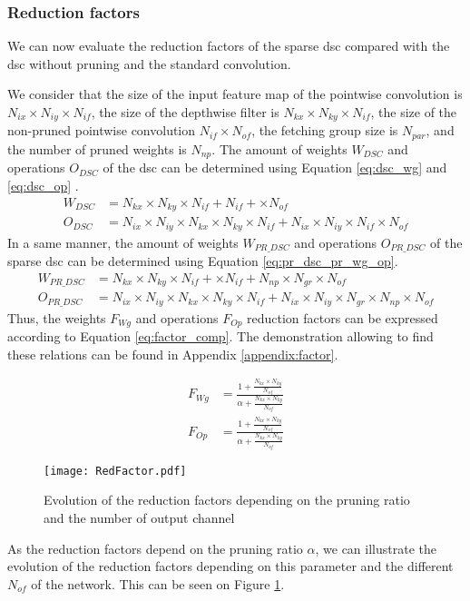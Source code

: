 \subsubsection{Reduction factors}
%
We can now evaluate the reduction factors of the sparse \acrshort{dsc} compared with the \acrshort{dsc} without pruning and the standard convolution.

We consider that the size of the input feature map of the pointwise convolution is $N_{ix}  \times N_{iy} \times N_{if}$, the size of the depthwise filter is $N_{kx} \times N_{ky} \times N_{if}$, the size of the non-pruned pointwise convolution $N_{if} \times N_{of}$, the fetching group size is $N_{par}$, and the number of pruned weights is $N_{np}$. The amount of weights $W_{DSC}$ and operations $O_{DSC}$ of the \acrshort{dsc} can be determined using Equation \eqref{eq:dsc_wg} and \eqref{eq:dsc_op} \cite{bai_cnn_2018, liu_fpga-based_2019}.
%
\begin{align}
    W_{DSC} &= N_{kx} \times N_{ky} \times N_{if} + N_{if} + \times N_{of}\\
    O_{DSC} &= N_{ix} \times N_{iy} \times N_{kx} \times N_{ky} \times N_{if} + N_{ix} \times N_{iy} \times N_{if} \times N_{of}
    \label{eq:dsc_op}
\end{align}
%
In a same manner, the amount of weights $W_{PR\_DSC}$ and operations $O_{PR\_DSC}$ of the sparse \acrshort{dsc} can be determined using Equation \eqref{eq:pr_dsc_pr_wg_op}.
%
\begin{align}
    W_{PR\_DSC} &= N_{kx} \times N_{ky} \times N_{if} + \times N_{if} + N_{np} \times N_{gr} \times N_{of}\\
    O_{PR\_DSC} &= N_{ix} \times N_{iy} \times N_{kx} \times N_{ky} \times N_{if} + N_{ix} \times N_{iy} \times N_{gr} \times N_{np} \times N_{of}
    \label{eq:pr_dsc_wg_op}
\end{align}
%
Thus, the weights $F_{Wg}$ and operations $F_{Op}$ reduction factors can be expressed according to Equation \eqref{eq:factor_comp}. The demonstration allowing to find these relations can be found in Appendix \ref{appendix:factor}.

\begin{align}
    F_{Wg} &= \frac{1 + \frac{N_{kx} \times N_{ky}} {N_{of}}} {\alpha + \frac{N_{kx} \times N_{ky}} {N_{of}}}\\
    F_{Op} &= \frac{1 + \frac{N_{kx} \times N_{ky}} {N_{of}}} {\alpha + \frac{N_{kx} \times N_{ky}} {N_{of}}}
    \label{eq:factor_comp}
\end{align}
%
\begin{figure}
    \centering
    \texttt{[image: RedFactor.pdf]}
    \caption{Evolution of the reduction factors depending on the pruning ratio and the number of output channel}
    \label{fig:redfacto}
\end{figure}
%
As the reduction factors depend on the pruning ratio $\alpha$, we can illustrate the evolution of the reduction factors depending on this parameter and the different $N_{of}$ of the network. This can be seen on Figure \ref{fig:redfacto}.

